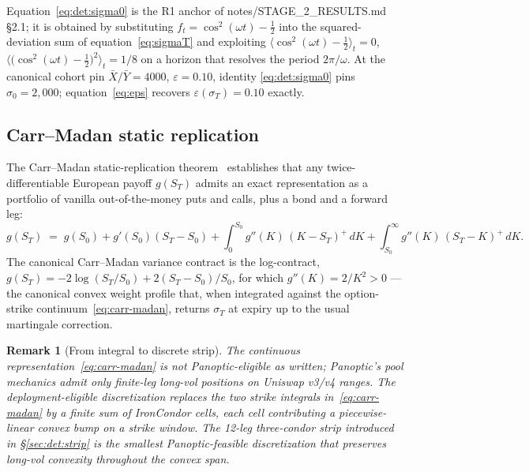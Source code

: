 \documentclass[11pt,letterpaper]{article}
\newtheorem{remark}{Remark}[section]
\newcommand{\sigmaT}{\sigma_{T}}
\newcommand{\epsT}{\varepsilon(\sigmaT)}
\newcommand{\Xbar}{\bar{X}}
\newcommand{\Ybar}{\bar{Y}}
\begin{document}
Equation~\eqref{eq:det:sigma0} is the R1 anchor of
\textsf{notes/STAGE\_2\_RESULTS.md} \S2.1; it is obtained by substituting
$f_t = \cos^{2}(\omega t) - \tfrac{1}{2}$ into the squared-deviation sum
of equation~\eqref{eq:sigmaT} and exploiting
$\langle \cos^{2}(\omega t) - \tfrac{1}{2}\rangle_{t} = 0$,
$\langle \bigl(\cos^{2}(\omega t) - \tfrac{1}{2}\bigr)^{2}\rangle_{t} = 1/8$
on a horizon that resolves the period $2\pi/\omega$. At the canonical
cohort pin $\Xbar/\Ybar = 4000$, $\varepsilon = 0.10$, identity
\eqref{eq:det:sigma0} pins $\sigma_{0} = 2{,}000$; equation~\eqref{eq:eps}
recovers $\epsT = 0.10$ exactly.

\subsection{Carr--Madan static replication}
\label{sec:det:carr-madan}

The Carr--Madan static-replication theorem~\cite{carr-madan-2001}
establishes that any twice-differentiable European payoff
$g(S_{T})$ admits an exact representation as a portfolio of vanilla
out-of-the-money puts and calls, plus a bond and a forward leg:
\begin{equation}
    g(S_{T})
    \;=\;
    g(S_{0}) + g'(S_{0})(S_{T} - S_{0})
    + \int_{0}^{S_{0}} g''(K)\,(K - S_{T})^{+}\,dK
    + \int_{S_{0}}^{\infty} g''(K)\,(S_{T} - K)^{+}\,dK.
    \label{eq:carr-madan}
\end{equation}
The canonical Carr--Madan variance contract is the log-contract,
$g(S_{T}) = -2\log(S_{T}/S_{0}) + 2(S_{T} - S_{0})/S_{0}$, for which
$g''(K) = 2/K^{2} > 0$ — the canonical convex weight profile that, when
integrated against the option-strike continuum~\eqref{eq:carr-madan},
returns $\sigmaT$ at expiry up to the usual martingale correction.

\begin{remark}[From integral to discrete strip]
\label{rem:strip-discretization}
The continuous representation~\eqref{eq:carr-madan} is not Panoptic-eligible
as written; Panoptic's pool mechanics admit only finite-leg long-vol
positions on Uniswap v3/v4 ranges. The deployment-eligible
discretization replaces the two strike integrals in~\eqref{eq:carr-madan}
by a finite sum of IronCondor cells, each cell contributing a piecewise-linear
convex bump on a strike window. The 12-leg three-condor strip introduced
in \S\ref{sec:det:strip} is the smallest Panoptic-feasible discretization
that preserves long-vol convexity throughout the convex span.
\end{remark}
\end{document}
